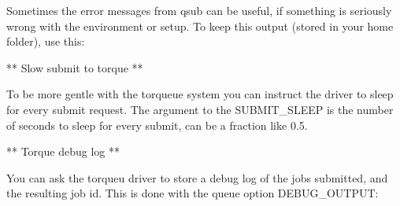 \documentclass[a4paper,10pt,english]{sphinxmanual}
\begin{document}

Sometimes the error messages from qsub can be useful, if something is seriously
wrong with the environment or setup. To keep this output (stored in your home
folder), use this:

%
\begin{sphinxVerbatim}[commandchars=\\\{\}]
   
\end{sphinxVerbatim}

** Slow submit to torque **

To be more gentle with the torqueue system you can instruct the driver to sleep
for every submit request. The argument to the SUBMIT\_SLEEP is the number of
seconds to sleep for every submit, can be a fraction like 0.5.

%
\begin{sphinxVerbatim}[commandchars=\\\{\}]
   
\end{sphinxVerbatim}

** Torque debug log **

You can ask the torqueu driver to store a debug log of the jobs submitted, and
the resulting job id. This is done with the queue option DEBUG\_OUTPUT:

%
\begin{sphinxVerbatim}[commandchars=\\\{\}]
   
\end{sphinxVerbatim}
\end{document}
